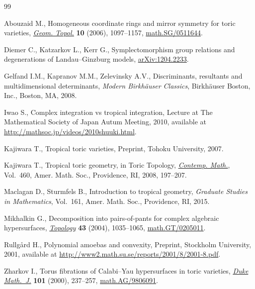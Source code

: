 \begin{thebibliography}{99}
\footnotesize\itemsep=0pt

Abouzaid M., Homogeneous coordinate rings and mirror symmetry for toric
 varieties, \href{http://dx.doi.org/10.2140/gt.2006.10.1097}{\textit{Geom. Topol.}} \textbf{10} (2006), 1097--1157,
 \href{http://arxiv.org/abs/math.SG/0511644}{math.SG/0511644}.

Diemer C., Katzarkov L., Kerr G., Symplectomorphism group relations and
 degenerations of {L}andau--{G}inzburg models, \href{http://arxiv.org/abs/1204.2233}{arXiv:1204.2233}.

Gelfand I.M., Kapranov M.M., Zelevinsky A.V., Discriminants, resultants and
 multidimensional determinants, \textit{Modern Birkh\"auser Classics}, Birkh\"auser
 Boston, Inc., Boston, MA, 2008.

Iwao S., Complex integration vs tropical integration, {L}ecture at The
 {M}athematical {S}ociety of {J}apan {A}utum {M}eeting, 2010, available at \url{http://mathsoc.jp/videos/2010shuuki.html}.

Kajiwara T., Tropical toric varieties, {P}reprint, Tohoku University, 2007.

Kajiwara T., Tropical toric geometry, in Toric Topology, \href{http://dx.doi.org/10.1090/conm/460/09018}{\textit{Contemp.
 Math.}}, Vol.~460, Amer. Math. Soc., Providence, RI, 2008, 197--207.

Maclagan D., Sturmfels B., Introduction to tropical geometry, \textit{Graduate
 Studies in Mathematics}, Vol.~161, Amer. Math. Soc., Providence, RI, 2015.

Mikhalkin G., Decomposition into pairs-of-pants for complex algebraic
 hypersurfaces, \href{http://dx.doi.org/10.1016/j.top.2003.11.006}{\textit{Topology}} \textbf{43} (2004), 1035--1065,
 \href{http://arxiv.org/abs/math.GT/0205011}{math.GT/0205011}.

Rullg{\aa}rd H., Polynomial amoebas and convexity, {P}reprint, Stockholm
 University, 2001, available at \url{http://www2.math.su.se/reports/2001/8/2001-8.pdf}.

Zharkov I., Torus f\/ibrations of {C}alabi--{Y}au hypersurfaces in toric
 varieties, \href{http://dx.doi.org/10.1215/S0012-7094-00-10124-X}{\textit{Duke Math.~J.}} \textbf{101} (2000), 237--257,
 \href{http://arxiv.org/abs/math.AG/9806091}{math.AG/9806091}.

\end{thebibliography}
